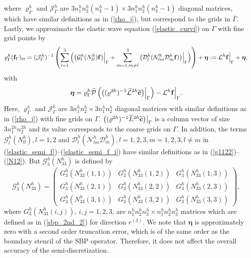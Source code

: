 where ${\varrho}^{h}_{\overline{\Gamma}}$ and ${\mathcal{J}}^{h}_{\overline{\Gamma}}$ are $3n_1^hn_2^h(n_3^h-1)\times 3n_1^hn_2^h(n_3^h-1)$ diagonal matrices, which have similar definitions as in (\ref{rho_j}), but correspond to the grids in $\overline{\Gamma}$. Lastly, we approximate the elastic wave equation (\ref{elastic_curvi}) on $\Gamma$ with fine grid points by
\begin{equation}\label{elastic_semi_f_i}
{\varrho}^h_\Gamma ({\bf f}_\Gamma)_{tt} =
( {\mathcal{ J}}^{h}_\Gamma)^{-1}\left(\sum_{l=1}^3\Big(\big(\mathcal{G}_l^{h}({N}_{ll}^h){\bf f}\big)\Big|_\Gamma+\sum_{m=1,m\neq l}^3\big(\mathcal{D}_l^{h}(\mathcal{N}_{lm}^{h}\mathcal{D}_m^{h}{\bf f})\big)\Big|_\Gamma\Big) \right) + {\bm \eta} := \mathcal{L}^h{\bf f}\Big|_\Gamma + {\bm \eta},
\end{equation}
with 
\begin{equation}\label{eta}
{\bm \eta} = {\varrho}^h_{\Gamma}\wt{\mathcal{P}}\left(\big(({ \varrho}^{2h})^{-1}\wt{\mathcal{L}}^{2h} \wt{{\bf c}}\big)\Big|_{\Gamma}\right) - \mathcal{L}^{h}{\bf f}\Big|_{\Gamma}.
\end{equation}
Here, ${\varrho}^{h}_{\Gamma}$ and ${\mathcal{ J}}^{h}_{\Gamma}$ are $3n_1^hn_2^h\times 3n_1^hn_2^h$ diagonal matrices with similar definitions as in (\ref{rho_j}) with fine grids on $\Gamma$. $\big(({\varrho}^{2h})^{-1}\widetilde{L}^{2h} \widetilde{{\bf c}}\big)\big|_{\Gamma}$ is a column vector of size $3n_1^{2h} n_2^{2h}$ and its value corresponds to the coarse grids on $\Gamma$. In addition, the terms $\mathcal{G}_l^h({N}_{ll}^h), l = 1,2$ and $\mathcal{D}_l^h(\mathcal{N}_{lm}^h\mathcal{D}_m^h), l=1,2,3,m=1,2,3,l\neq m$ in (\ref{elastic_semi_f})--(\ref{elastic_semi_f_i}) have similar definitions as in (\ref{g1122})--(\ref{N12}). But $\mathcal{G}_3^h({N}_{33}^h)$ is defined by
\[ \mathcal{G}^{h}_3({N}_{33}^h) = \left(\begin{array}{ccc}
G_3^{h}(N_{33}^{h}(1,1)) & G_3^{h}(N_{33}^{h}(1,2))  & G_3^{h}(N_{33}^{h}(1,3)) \\
G_3^{h}(N_{33}^{h}(2,1)) & G_3^{h}(N_{33}^{h}(2,2))  & G_3^{h}(N_{33}^{h}(2,3)) \\
G_3^{h}(N_{33}^{h}(3,1)) & G_3^{h}(N_{33}^{h}(3,2))  & G_3^{h}(N_{33}^{h}(3,3)) \end{array}\right),\]
where ${G}_3^{h}(N_{33}^{h}(i,j))$, $i,j = 1,2,3$, are $n_1^{h}n_2^{h}n_3^{h}\times n_1^{h}n_2^{h}n_3^{h}$ matrices which are defined as in (\ref{sbp_2nd_2}) for direction $r^{(3)}$. We note that $\bm \eta$ is approximately zero with a second order truncation error, which is of the same order as the boundary stencil of the SBP operator. Therefore, it does not affect the overall accuracy of the semi-discretization. 

